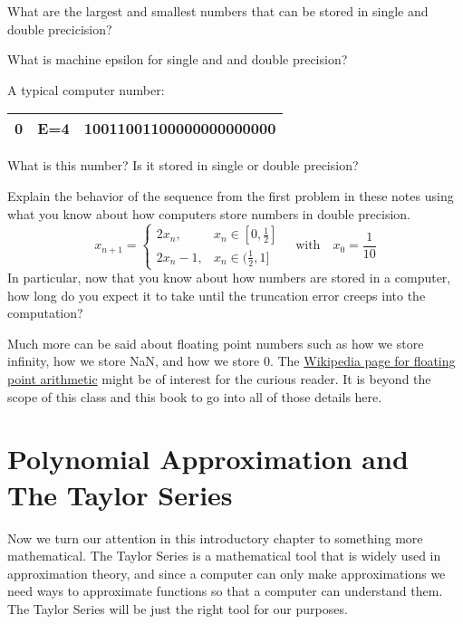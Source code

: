 \begin{problem}
    What are the largest and smallest numbers that can be stored in single and double
    precicision?
\end{problem}

\begin{problem}
    What is machine epsilon for single and and double precision?
\end{problem}



\begin{problem}
A typical computer number:
    \begin{center}
        \begin{tabular}{|c|c|c|}
            \hline
            0 & E=4 & 10011001100000000000000 \\ \hline
        \end{tabular}
    \end{center}
    What is this number?  Is it stored in single or double precision? 
\end{problem}


\begin{problem}
    Explain the behavior of the sequence from the first problem in these notes using what
    you know about how computers store numbers in double precision.
    \[ x_{n+1} = \left\{ \begin{array}{ll} 2x_n, & x_n \in [0,\frac{1}{2}] \\ 2x_n - 1, & x_n \in
        (\frac{1}{2},1] \end{array} \right. \quad \text{with} \quad x_0 = \frac{1}{10} \]
    In particular, now that you know about how numbers are stored in a computer, how long
    do you expect it to take until the truncation error creeps into the computation?
\end{problem}

Much more can be said about floating point numbers such as how we store infinity, how we store
NaN, and how we store 0.  The
\href{https://en.wikipedia.org/wiki/Floating-point_arithmetic}{Wikipedia page for floating
point arithmetic} might be of interest for the curious reader.  It is beyond the scope of
this class and this book to go into all of those details here.




\newpage\section{Polynomial Approximation and The Taylor Series}
Now we turn our attention in this introductory chapter to something more mathematical.
The Taylor Series is a mathematical tool that is widely used in approximation theory, and
since a computer can only make approximations we need ways to approximate functions so
that a computer can understand them. The Taylor Series will be just the right tool for our
purposes.  

